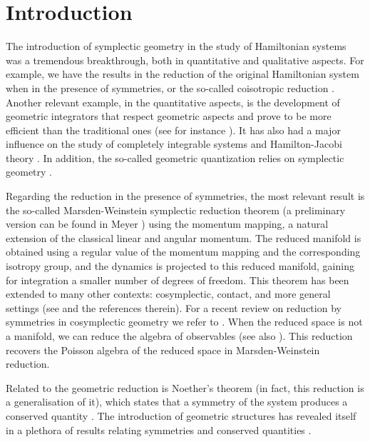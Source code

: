 \documentclass[12pt]{article}
\newcommand{\sectiontitle}{section}
\newcommand{\setsectiontitle}[1]{\renewcommand{\sectiontitle}{\footnotesize\textit{#1}}}
\begin{document}
 \tableofcontents
 
\section{Introduction}
\setsectiontitle{INTRODUCTION}


The introduction of symplectic geometry in the study of Hamiltonian systems was a tremendous breakthrough, both in quantitative and qualitative aspects. For example, we have the results in the reduction of the original Hamiltonian system when in the presence of symmetries, or the so-called coisotropic reduction \cites{abraham2008foundations,arnold,libermann2012symplectic,de2011methods}. Another relevant example, in the quantitative aspects, is the development of geometric integrators that respect geometric aspects and prove to be more efficient than the traditional ones (see for instance \cites{sanzserna, marsdenbook}). It has also had a major influence on the study of completely integrable systems and Hamilton-Jacobi theory \cites{arnold,abraham2008foundations,catalanes,vaquero}. In addition, the so-called geometric quantization relies on symplectic geometry \cites{kostant,SouriauDynamical}.

Regarding the reduction in the presence of symmetries, the most relevant result is the so-called Marsden-Weinstein symplectic reduction theorem \cites{marsden1974reduction} (a preliminary version can be found in Meyer \cites{meyer}) using the momentum mapping, a natural extension of the classical linear and angular momentum. The reduced manifold is obtained using a regular value of the momentum mapping and the corresponding isotropy group, and the dynamics is projected to this reduced manifold, gaining for integration a smaller number of degrees of freedom. This theorem has been extended to many other contexts: cosymplectic, contact, and more general settings (see \cites{acakpo2022stable, albert1989theoreme, de1993cosymplectic, de2019contact, garcia2022momentum, Lainztesis, marsden1990reduction,willett} and the references therein). For a recent review on reduction by symmetries in cosymplectic geometry we refer to \cites{delucas2023cosymplectic}.
When the reduced space is not a manifold, we can reduce the algebra of observables \cites{Sniatycki1983ReductionAQ} (see also \cites{beppe}). This reduction recovers the Poisson algebra of the reduced space in Marsden-Weinstein reduction. 

Related to the geometric reduction is Noether's theorem (in fact, this reduction is a generalisation of it), which states that a symmetry of the system produces a conserved quantity \cites{binz}. The introduction of geometric structures has revealed itself in a plethora of results relating symmetries and conserved quantities \cites{de2011methods}.
\end{document}
